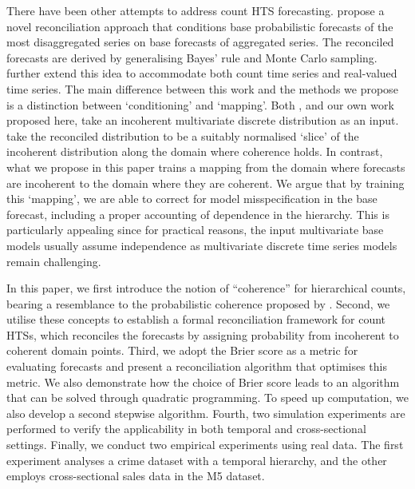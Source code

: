 \documentclass[a4paper,review,11pt,authoryear]{elsarticle}
\theoremstyle{definition}
\begin{document}
There have been other attempts to address count HTS forecasting.
\cite{coraniProbabilisticReconciliationCount2022} propose a novel reconciliation approach that conditions base probabilistic forecasts of the most disaggregated series on base forecasts of aggregated series.
The reconciled forecasts are derived by generalising Bayes’ rule and Monte Carlo sampling.
\cite{zambonEfficientProbabilisticReconciliation2022} further extend this idea to accommodate both count time series and real-valued time series. The main difference between this work and the methods we propose is a distinction between `conditioning' and `mapping'. Both \cite{zambonEfficientProbabilisticReconciliation2022}, and our own work proposed here, take an incoherent multivariate discrete distribution as an input.  \cite{zambonEfficientProbabilisticReconciliation2022} take the reconciled distribution to be a suitably normalised `slice' of the incoherent distribution along the domain where coherence holds. In contrast, what we propose in this paper trains a mapping from the domain where forecasts are incoherent to the domain where they are coherent. We argue that by training this `mapping', we are able to correct for model misspecification in the base forecast, including a proper accounting of dependence in the hierarchy. This is particularly appealing since for practical reasons, the input multivariate base models usually assume independence as multivariate discrete time series models remain challenging.

In this paper,  we first introduce the notion of ``coherence'' for hierarchical counts,
bearing a resemblance to the probabilistic coherence proposed by \cite{panagiotelisProbabilisticForecastReconciliation2022}.
Second, we utilise these concepts to establish a formal reconciliation framework for count HTSs, which reconciles the forecasts by assigning probability from incoherent to coherent domain points.
Third, we adopt the Brier score as a metric for evaluating forecasts and present a reconciliation algorithm that optimises this metric.
We also demonstrate how the choice of Brier score leads to an algorithm that can be solved through quadratic programming. To speed up computation, we also develop a second stepwise algorithm.
Fourth, two simulation experiments are performed to verify the applicability in both temporal and cross-sectional settings.
Finally, we conduct two empirical experiments using real data. The first experiment analyses a crime dataset with a temporal hierarchy, and the other employs cross-sectional sales data in the M5 dataset.
\end{document}
